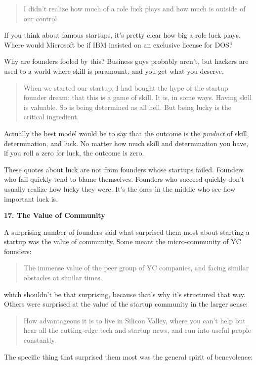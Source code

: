 \begin{quote}
I didn't realize how much of a role luck plays and how much is outside
of our control.
\end{quote}

If you think about famous startups, it's pretty clear how big a role
luck plays. Where would Microsoft be if IBM insisted on an exclusive
license for DOS?

Why are founders fooled by this? Business guys probably aren't, but
hackers are used to a world where skill is paramount, and you get what
you deserve.

\begin{quote}
When we started our startup, I had bought the hype of the startup
founder dream: that this is a game of skill. It is, in some ways. Having
skill is valuable. So is being determined as all hell. But being lucky
is the critical ingredient.
\end{quote}

Actually the best model would be to say that the outcome is the
\emph{product} of skill, determination, and luck. No matter how much
skill and determination you have, if you roll a zero for luck, the
outcome is zero.

These quotes about luck are not from founders whose startups failed.
Founders who fail quickly tend to blame themselves. Founders who succeed
quickly don't usually realize how lucky they were. It's the ones in the
middle who see how important luck is.

\textbf{17. The Value of Community}

A surprising number of founders said what surprised them most about
starting a startup was the value of community. Some meant the
micro-community of YC founders:

\begin{quote}
The immense value of the peer group of YC companies, and facing similar
obstacles at similar times.
\end{quote}

which shouldn't be that surprising, because that's why it's structured
that way. Others were surprised at the value of the startup community in
the larger sense:

\begin{quote}
How advantageous it is to live in Silicon Valley, where you can't help
but hear all the cutting-edge tech and startup news, and run into useful
people constantly.
\end{quote}

The specific thing that surprised them most was the general spirit of
benevolence:

